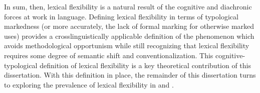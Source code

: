 In sum, then, lexical flexibility is a natural result of the cognitive and diachronic forces at work in language. Defining lexical flexibility in terms of typological markedness (or more accurately, the lack of formal marking for otherwise marked uses) provides a crosslinguistically applicable definition of the phenomenon which avoids methodological opportunism while still recognizing that lexical flexibility requires some degree of semantic shift and conventionalization. This cognitive-typological definition of lexical flexibility is a key theoretical contribution of this dissertation. With this definition in place, the remainder of this dissertation turns to exploring the prevalence of lexical flexibility in  and .
